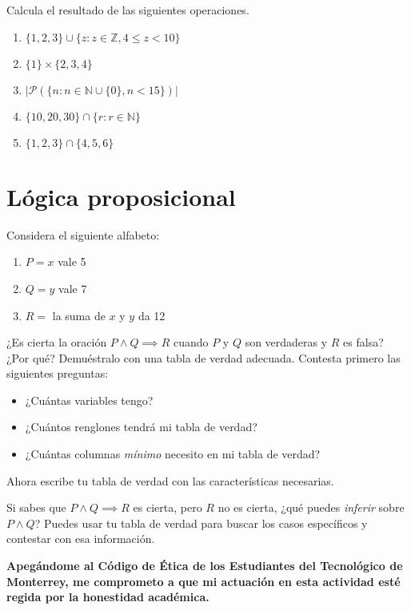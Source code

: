 \documentclass[spanish, 10pt]{article}
\begin{document}
Calcula el resultado de las siguientes operaciones.

\begin{enumerate}[label=\tt \alph*)]
    \itemsep0em
    \item $\{1, 2, 3\} \cup \{z : z \in \mathbb{Z}, 4 \leq z < 10 \}$
    \item $\{1\} \times \{2,3,4\}$
    \item $|\mathscr{P}(\{n : n \in \mathbb{N} \cup \{0\}, n < 15\})|$
    \item $\{10, 20, 30\} \cap \{r : r \in \mathbb{N}\}$
    \item $\{1, 2, 3\} \cap \{4, 5, 6\}$
\end{enumerate}

\pagebreak

\section{Lógica proposicional}

Considera el siguiente alfabeto:

\begin{enumerate}
    \item $P = x$ vale 5
    \item $Q = y$ vale 7
    \item $R = $ la suma de $x$ y $y$ da 12
\end{enumerate}

¿Es cierta la oración $P \wedge Q \implies R$ cuando $P$ y $Q$ son verdaderas y $R$ es falsa? ¿Por qué? Demuéstralo con una tabla de verdad adecuada. Contesta primero las siguientes preguntas:

\begin{itemize}
    \item ¿Cuántas variables tengo?
    \item ¿Cuántos renglones tendrá mi tabla de verdad?
    \item ¿Cuántas columnas \textit{mínimo} necesito en mi tabla de verdad?
\end{itemize}

Ahora escribe tu tabla de verdad con las características necesarias.

Si sabes que $P \wedge Q \implies R$ es cierta, pero $R$ no es cierta, ¿qué puedes \textit{inferir} sobre $P \wedge Q$? Puedes usar tu tabla de verdad para buscar los casos específicos y contestar con esa información.


\vfill

\textbf{Apegándome al Código de Ética de los Estudiantes del Tecnológico de Monterrey, me comprometo a que mi actuación en esta actividad esté regida por la honestidad académica.}
\end{document}
